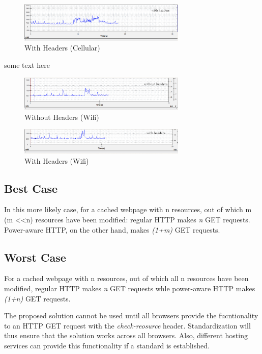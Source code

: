 \documentclass[9pt]{sigplan-proc-varsize}
\begin{document}
\begin{figure}[ht!]
\centering
\includegraphics[width=80mm]{cellular_withheaders.png}
\caption{With Headers (Cellular) }
\label{fig:sp_gd_mnist}
\end{figure}

some text here

\begin{figure}[ht!]
\centering
\includegraphics[width=80mm]{wifi_withoutheaders.png}
\caption{Without Headers (Wifi) }
\label{fig:sp_gd_mnist}
\end{figure}

\begin{figure}[ht!]
\centering
\includegraphics[width=80mm]{wifi_withheaders.png}
\caption{With Headers (Wifi) }
\label{fig:sp_gd_mnist}
\end{figure}

\bigskip

\subsection{Best Case}

In this more likely case, for a cached webpage with n resources, out of which m (m \textless \textless n) resources have been modified: regular HTTP makes {\it n} GET requests. Power-aware HTTP, on the other hand, makes {\it (1+m)} GET requests.

\subsection{Worst Case}

For a cached webpage with n resources, out of which all n resources have been modified, regular HTTP
makes {\it n} GET requests whle power-aware HTTP makes {\it (1+n)} GET requests.

The proposed solution cannot be used until all browsers provide the fucntionality to an HTTP GET request with the {\it check-reosurce} header. Standardization will thus ensure that the solution works across all browsers. Also, different hosting services can provide this functionality if a standard is established.
\end{document}
